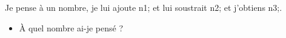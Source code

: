 \documentclass[exercice]{thedocument}%
\begin{document}
%
    Je pense à un nombre, je lui ajoute \<n1; et lui soustrait \<n2; et j'obtiens \<n3;.
    \begin{itemize}
        \item À quel nombre ai-je pensé ?
    \end{itemize}
\end{document}
